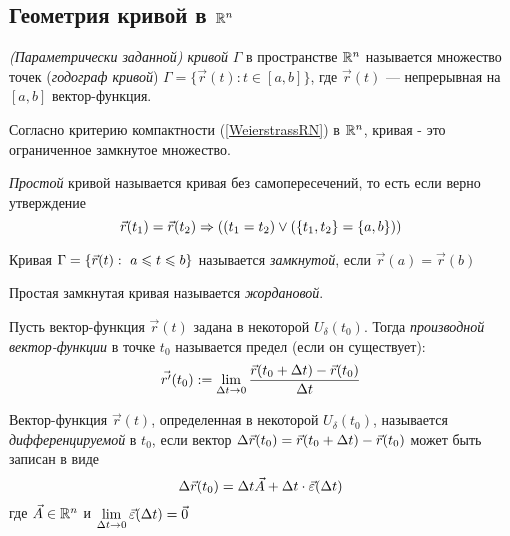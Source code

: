 \subsection{Геометрия кривой в $\mathbb{R}^n$}

\begin{definition}
	\textit{(Параметрически заданной) кривой} $\Gamma$ в
	пространстве $\mathbb{R}^n$ называется множество точек
	(\textit{годограф кривой})
	$
		\Gamma = \{\vec{r}(t): t \in [a, b]\}
	$,
	где $\vec{r}(t)$ --- непрерывная на $[a, b]$
	вектор-функция.
\end{definition}

\begin{corollary}
	Согласно критерию компактности (\ref{WeierstrassRN}) в $\mathbb{R}^n$,
	кривая - это ограниченное замкнутое множество.
\end{corollary}

\begin{definition}
	\textit{Простой} кривой называется кривая без
	самопересечений, то есть если верно утверждение
	\[
		\vec{r}(t_1) = \vec{r}(t_2) \Rightarrow \left((t_1 = t_2)
		\vee (\{t_1, t_2\} = \{a, b\})\right)
	\]
\end{definition}

\begin{definition}
	Кривая $\Gamma = \{\vec{r}(t) :\  a \leqslant t \leqslant b\}$
	называется \textit{замкнутой}, если $\vec{r}(a) = \vec{r}(b)$
\end{definition}

\begin{definition}
	Простая замкнутая кривая называется \textit{жордановой}.
\end{definition}

\begin{definition}
	Пусть вектор-функция $\vec{r}(t)$ задана в некоторой
	$U_\delta(t_0)$. Тогда
	\textit{производной вектор-функции} в точке $t_0$
	называется предел (если он существует):
	\[
		\vec{r'}(t_0) := \lim\limits_{\Delta t \to 0}
		\frac{\vec{r}(t_0 + \Delta t) - \vec{r}(t_0)}{\Delta t}
	\]
\end{definition}

\begin{definition}
	Вектор-функция $\vec{r}(t)$, определенная в некоторой
	$U_\delta(t_0)$, называется \textit{дифференцируемой}
	в $t_0$, если вектор $\Delta\vec{r}(t_0) =
	\vec{r}(t_0 + \Delta t) - \vec{r}(t_0)$ может быть
	записан в виде
	\[
		\Delta\vec{r}(t_0) = \Delta t \vec{A} + \Delta t
		\cdot \vec{\varepsilon}(\Delta t)
	\]
	где $\vec{A} \in \mathbb{R}^n$ и $\lim\limits_{\Delta t \to 0}
	\vec{\varepsilon}(\Delta t) = \vec{0}$
\end{definition}

